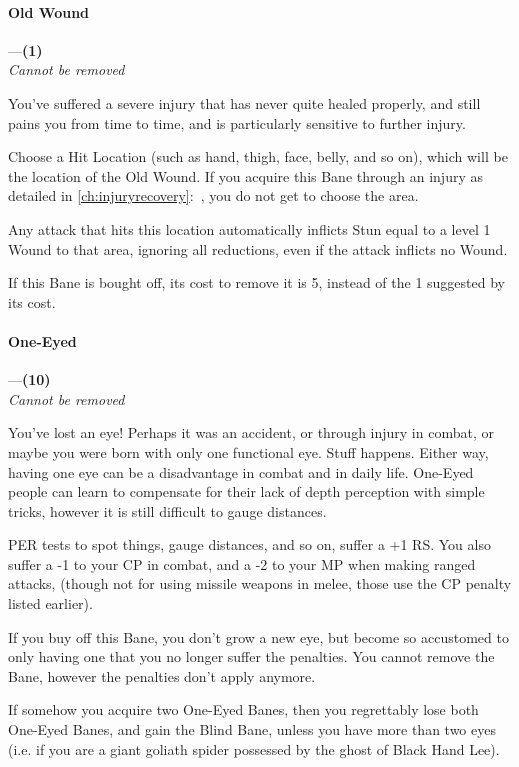 \documentclass[oneside,11pt,english]{book}
\begin{document}
\paragraph{\label{bane:Old Wound}Old Wound}---\quad\textbf{(1) }\\
\emph{Cannot be removed}\par
You've suffered a severe injury that has never quite healed properly, and still pains you from time to time, and is particularly sensitive to further injury. 


Choose a Hit Location (such as hand, thigh, face, belly, and so on), which will be the location of the Old Wound. If you acquire this Bane through an injury as detailed in \autoref{ch:injuryrecovery}:~, you do not get to choose the area.


Any attack that hits this location automatically inflicts Stun equal to a level 1 Wound to that area, ignoring all reductions, even if the attack inflicts no Wound.


If this Bane is bought off, its cost to remove it is 5, instead of the 1 suggested by its cost. 
\paragraph{\label{bane:One-Eyed}One-Eyed}---\quad\textbf{(10) }\\
\emph{Cannot be removed}\par
You've lost an eye! Perhaps it was an accident, or through injury in combat, or maybe you were born with only one functional eye. Stuff happens. Either way, having one eye can be a disadvantage in combat and in daily life. One-Eyed people can learn to compensate for their lack of depth perception with simple tricks, however it is still difficult to gauge distances.


PER tests to spot things, gauge distances, and so on, suffer a +1 RS. You also suffer a -1 to your CP in combat, and a -2 to your MP when making ranged attacks, (though not for using missile weapons in melee, those use the CP penalty listed earlier).


If you buy off this Bane, you don't grow a new eye, but become so accustomed to only having one that you no longer suffer the penalties. You cannot remove the Bane, however the penalties don't apply anymore.


If somehow you acquire two One-Eyed Banes, then you regrettably lose both One-Eyed Banes, and gain the Blind Bane, unless you have more than two eyes (i.e. if you are a giant goliath spider possessed by the ghost of Black Hand Lee).
\end{document}
